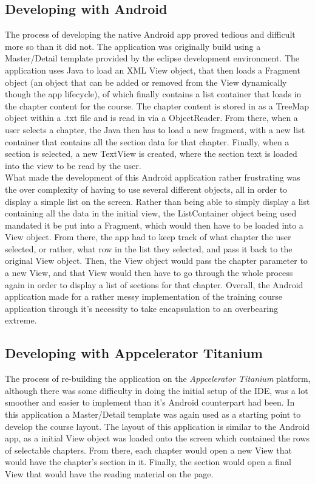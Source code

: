 \documentclass[11pt, twocolumn]{article}
\begin{document}
\subsection{Developing with Android}
The process of developing the native Android app proved tedious and difficult more so than it did not.  The application was originally build using a Master/Detail template provided by the eclipse development environment.  The application uses Java to load an XML View object, that then loads a Fragment object (an object that can be added or removed from the View dynamically though the app lifecycle), of which finally contains a list container that loads in the chapter content for the course.  The chapter content is stored in as a TreeMap object within a .txt file and is read in via a ObjectReader.  From  there, when a user selects a chapter, the Java then has to load a new fragment, with a new list container that contains all the section data for that chapter.  Finally, when a section is selected, a new TextView is created, where the section text is loaded into the view to be read by the user.\\

What made the development of this Android application rather frustrating was the over complexity of having to use several different objects, all in order to display a simple list on the screen.  Rather than being able to simply display a list containing all the data in the initial view, the ListContainer object being used mandated it be put into a Fragment, which would then have to be loaded into a View object.  From there, the app had to keep track of what chapter the user selected, or rather, what row in the list they selected, and pass it back to the original View object.  Then, the View object would pass the chapter parameter to a new View, and that View would then have to go through the whole process again in order to display a list of sections for that chapter.  Overall, the Android application made for a rather messy implementation of the training course application through it's necessity to take encapsulation to an overbearing extreme.\\

\subsection{Developing with Appcelerator Titanium}
The process of re-building the application on the {\it Appcelerator Titanium} platform, although there was some difficulty in doing the initial setup of the IDE, was a lot smoother and easier to implement than it's Android counterpart had been.  In this application a Master/Detail template was again used as a starting point to develop the course layout.  The layout of this application is similar to the Android app, as a initial View object was loaded onto the screen which contained the rows of selectable chapters.  From there, each chapter would open a new View that would have the chapter's section in it.  Finally, the section would open a final View that would have the reading material on the page.\\
\end{document}
